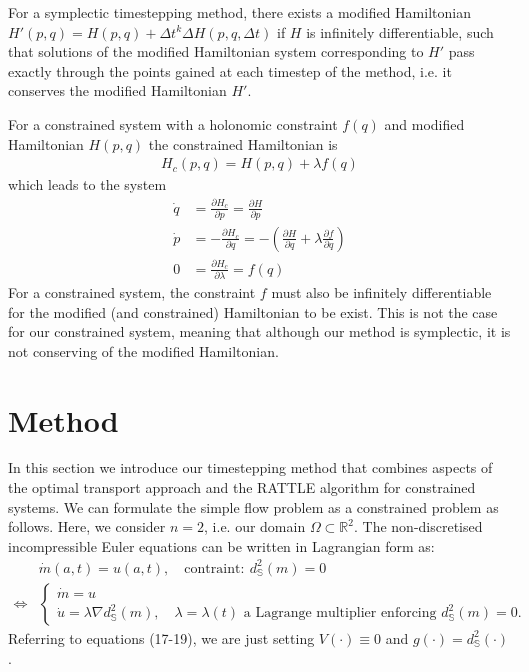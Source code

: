 \documentclass[11pt, oneside]{article}   	%
\newcommand{\R}{\mathbb{R}}
\newcommand{\dsmsq}{d^{2}_{\mathbb{S}}(m)}
\newcommand{\graddsmsq}{\nabla{d^{2}_{\mathbb{S}}(m)}}
\newcommand{\dt}{\Delta t}
\newcommand{\Sb}{\mathbb{S}}
\begin{document}
For a symplectic timestepping method, there exists a modified Hamiltonian \(H'(p, q) = H(p, q) + \dt^k \Delta H(p, q, \dt)\) if \(H\) is infinitely differentiable, such that solutions of the modified Hamiltonian system corresponding to \(H'\) pass exactly through the points gained at each timestep of the method, i.e. it conserves the modified Hamiltonian \(H'\).

For a constrained system with a holonomic constraint \(f(q)\) and modified Hamiltonian \(H(p, q)\) the constrained Hamiltonian is
\begin{align}
H_c(p, q) = H(p, q) + \lambda f(q)
\end{align}
which leads to the system
\begin{align}
\dot{q} &= \frac{\partial H_c}{\partial p} = \frac{\partial H}{\partial p} \\
\dot{p} &= - \frac{\partial H_c}{\partial q} = - (\frac{\partial H}{\partial q} + \lambda \frac{\partial f}{\partial q})\\
0 &= \frac{\partial H_c}{\partial \lambda} = f(q)
\end{align}
For a constrained system, the constraint \(f\) must also be infinitely differentiable for the modified (and constrained) Hamiltonian to be exist. This is not the case for our constrained system, meaning that although our method is symplectic, it is not conserving of the modified Hamiltonian.


\section{Method}

In this section we introduce our timestepping method that combines aspects of the optimal transport approach and the RATTLE algorithm for constrained systems. We can formulate the simple flow problem as a constrained problem as follows. Here, we consider \(n=2\), i.e. our domain \(\Omega \subset \R^2\). The non-discretised incompressible Euler equations can be written in Lagrangian form as:
\begin{align}
& \dot{m}(a, t) = u(a,t), \quad \text{contraint}: \: \dsmsq = 0 \\
\iff
 &\begin{cases}
  \dot{m} = u \\
  \dot{u} = \lambda \graddsmsq, \quad \lambda = \lambda(t) \text{ a Lagrange multiplier enforcing } \dsmsq = 0.
 \end{cases} 
\end{align}
Referring to equations (17-19), we are just setting \(V(\cdot) \equiv 0\) and \(g(\cdot) = d^2_{\Sb}(\cdot)\).
\end{document}

